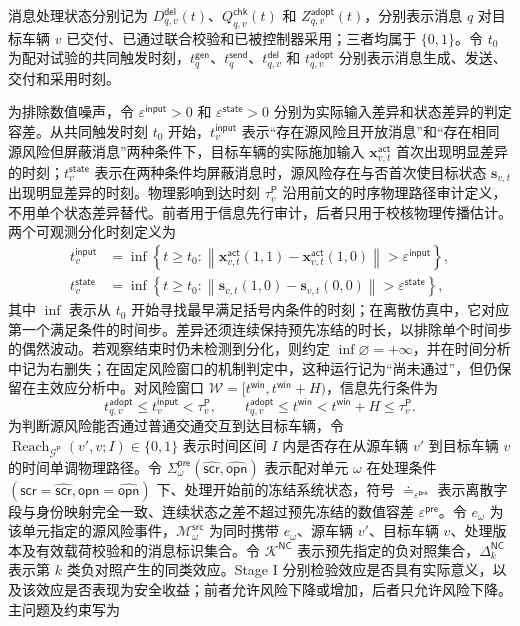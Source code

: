 \documentclass[10pt,a4paper,twocolumn]{article}
\newcommand{\revBlue}[1]{#1}
\begin{document}
\revBlue{消息处理状态分别记为 $D_{q,v}^{\mathsf{del}}(t)$、$Q_{q,v}^{\mathsf{chk}}(t)$ 和 $Z_{q,v}^{\mathsf{adopt}}(t)$，分别表示消息 $q$ 对目标车辆 $v$ 已交付、已通过联合校验和已被控制器采用；三者均属于 $\{0,1\}$。令 $t_0$ 为配对试验的共同触发时刻，$t_q^{\mathsf{gen}}$、$t_q^{\mathsf{send}}$、$t_{q,v}^{\mathsf{del}}$ 和 $t_{q,v}^{\mathsf{adopt}}$ 分别表示消息生成、发送、交付和采用时刻。}

为排除数值噪声，令 $\varepsilon^{\mathsf{input}}>0$ 和 $\varepsilon^{\mathsf{state}}>0$ 分别为实际输入差异和状态差异的判定容差。从共同触发时刻 $t_0$ 开始，$t_v^{\mathsf{input}}$ 表示“存在源风险且开放消息”和“存在相同源风险但屏蔽消息”两种条件下，目标车辆的实际施加输入 $\bm x_{v,t}^{\mathsf{act}}$ 首次出现明显差异的时刻；$t_v^{\mathsf{state}}$ 表示在两种条件均屏蔽消息时，源风险存在与否首次使目标状态 $\bm s_{v,t}$ 出现明显差异的时刻。物理影响到达时刻 $\tau_v^{\mathsf P}$ 沿用前文的时序物理路径审计定义，不用单个状态差异替代。前者用于信息先行审计，后者只用于校核物理传播估计。两个可观测分化时刻定义为
\begin{equation}
\begin{aligned}
t_v^{\mathsf{input}}&=\inf\left\{t\geq t_0:\left\|\bm x_{v,t}^{\mathsf{act}}(1,1)-\bm x_{v,t}^{\mathsf{act}}(1,0)\right\|>\varepsilon^{\mathsf{input}}\right\},\\
t_v^{\mathsf{state}}&=\inf\left\{t\geq t_0:\left\|\bm s_{v,t}(1,0)-\bm s_{v,t}(0,0)\right\|>\varepsilon^{\mathsf{state}}\right\},
\end{aligned}
\end{equation}
其中 $\inf$ 表示从 $t_0$ 开始寻找最早满足括号内条件的时刻；在离散仿真中，它对应第一个满足条件的时间步。差异还须连续保持预先冻结的时长，以排除单个时间步的偶然波动。若观察结束时仍未检测到分化，则约定 $\inf\varnothing=+\infty$，并在时间分析中记为右删失；在固定风险窗口的机制判定中，这种运行记为“尚未通过”，但仍保留在主效应分析中。对风险窗口 $\mathcal W=[t^{\mathsf{win}},t^{\mathsf{win}}+H)$，信息先行条件为
\begin{equation}
t_{q,v}^{\mathsf{adopt}}\leq t_v^{\mathsf{input}}<\tau_v^{\mathsf P},\qquad
t_{q,v}^{\mathsf{adopt}}\leq t^{\mathsf{win}}<t^{\mathsf{win}}+H\leq\tau_v^{\mathsf P}.
\end{equation}
为判断源风险能否通过普通交通交互到达目标车辆，令 $\operatorname{Reach}_{\mathcal G^{\mathsf P}}(v',v;I)\in\{0,1\}$ 表示时间区间 $I$ 内是否存在从源车辆 $v'$ 到目标车辆 $v$ 的时间单调物理路径。令 $\Sigma_{\omega}^{\mathsf{pre}}(\hat{\mathsf{scr}},\hat{\mathsf{opn}})$ 表示配对单元 $\omega$ 在处理条件 $(\mathsf{scr}=\hat{\mathsf{scr}},\mathsf{opn}=\hat{\mathsf{opn}})$ 下、处理开始前的冻结系统状态，符号 $\doteq_{\varepsilon^{\mathsf{pre}}}$ 表示离散字段与身份映射完全一致、连续状态之差不超过预先冻结的数值容差 $\varepsilon^{\mathsf{pre}}$。令 $e_\omega$ 为该单元指定的源风险事件，$\mathcal M_{\omega}^{\mathsf{src}}$ 为同时携带 $e_\omega$、源车辆 $v'$、目标车辆 $v$、处理版本及有效载荷校验和的消息标识集合。令 $\mathcal K^{\mathsf{NC}}$ 表示预先指定的负对照集合，$\Delta_{k}^{\mathsf{NC}}$ 表示第 $k$ 类负对照产生的同类效应。Stage I 分别检验效应是否具有实际意义，以及该效应是否表现为安全收益；前者允许风险下降或增加，后者只允许风险下降。主问题及约束写为
\end{document}
